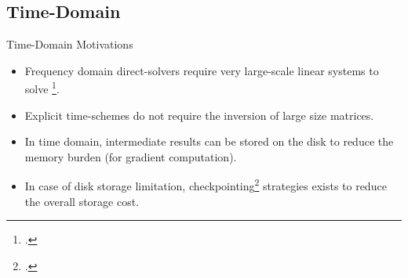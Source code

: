 \subsection{Time-Domain}
\begin{frame}{Time-Domain Motivations}

\begin{itemize}
\item<2-> Frequency domain direct-solvers require very large-scale linear systems to solve \footcite{operto20073d}.
\item<3-> Explicit time-schemes do not require the inversion of large size matrices.
\item<4-> In time domain, intermediate results can be stored on the disk to reduce the memory burden (for gradient computation).
\item<5-> In case of disk storage limitation, checkpointing\footcite{griewankAchievingLogarithmicGrowth1992} strategies exists to reduce the overall storage cost.
\end{itemize}

\end{frame}



